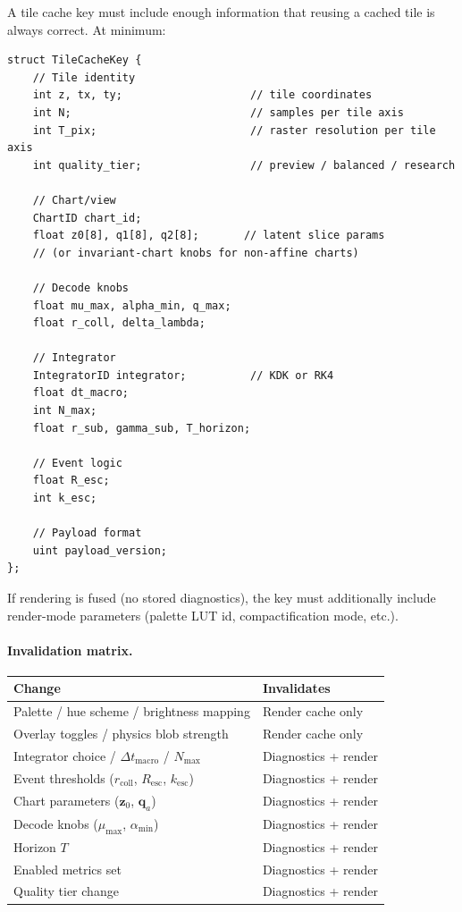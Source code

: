 \documentclass[11pt]{report}
\begin{document}
A tile cache key must include enough information that reusing a cached tile is always correct. At minimum:

\begin{verbatim}
struct TileCacheKey {
    // Tile identity
    int z, tx, ty;                    // tile coordinates
    int N;                            // samples per tile axis
    int T_pix;                        // raster resolution per tile axis
    int quality_tier;                 // preview / balanced / research

    // Chart/view
    ChartID chart_id;
    float z0[8], q1[8], q2[8];       // latent slice params
    // (or invariant-chart knobs for non-affine charts)

    // Decode knobs
    float mu_max, alpha_min, q_max;
    float r_coll, delta_lambda;

    // Integrator
    IntegratorID integrator;          // KDK or RK4
    float dt_macro;
    int N_max;
    float r_sub, gamma_sub, T_horizon;

    // Event logic
    float R_esc;
    int k_esc;

    // Payload format
    uint payload_version;
};
\end{verbatim}

If rendering is fused (no stored diagnostics), the key must additionally include render-mode parameters (palette LUT id, compactification mode, etc.).

\paragraph{Invalidation matrix.}
\begin{center}
\begin{tabular}{ll}
\toprule
Change & Invalidates \\
\midrule
Palette / hue scheme / brightness mapping & Render cache only \\
Overlay toggles / physics blob strength & Render cache only \\
Integrator choice / $\Delta t_{\mathrm{macro}}$ / $N_{\max}$ & Diagnostics + render \\
Event thresholds ($r_{\mathrm{coll}}$, $R_{\mathrm{esc}}$, $k_{\mathrm{esc}}$) & Diagnostics + render \\
Chart parameters ($\mathbf z_0$, $\mathbf q_a$) & Diagnostics + render \\
Decode knobs ($\mu_{\max}$, $\alpha_{\min}$) & Diagnostics + render \\
Horizon $T$ & Diagnostics + render \\
Enabled metrics set & Diagnostics + render \\
Quality tier change & Diagnostics + render \\
\bottomrule
\end{tabular}
\end{center}
\end{document}
